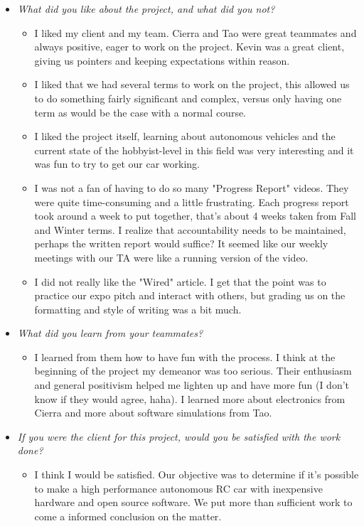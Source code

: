 \documentclass[compsoc,draftclsnofoot,onecolumn,10pt]{IEEEtran}
\begin{document}
\begin{itemize}
    \item \textit{What did you like about the project, and what did you not?}
    \begin{itemize}
        \item I liked my client and my team. Cierra and Tao were great teammates and always positive, eager to work on the project. Kevin was a great client, giving us pointers and keeping expectations within reason.
        \item I liked that we had several terms to work on the project, this allowed us to do something fairly significant and complex, versus only having one term as would be the case with a normal course.
        \item I liked the project itself, learning about autonomous vehicles and the current state of the hobbyist-level in this field was very interesting and it was fun to try to get our car working.
        \item I was not a fan of having to do so many "Progress Report" videos. They were quite time-consuming and a little frustrating. Each progress report took around a week to put together, that's about 4 weeks taken from Fall and Winter terms. I realize that accountability needs to be maintained, perhaps the written report would suffice? It seemed like our weekly meetings with our TA were like a running version of the video.
        \item I did not really like the "Wired" article. I get that the point was to practice our expo pitch and interact with others, but grading us on the formatting and style of writing was a bit much.
    \end{itemize}

    \item \textit{What did you learn from your teammates?}
    \begin{itemize}
        \item I learned from them how to have fun with the process. I think at the beginning of the project my demeanor was too serious. Their enthusiasm and general positivism helped me lighten up and have more fun (I don't know if they would agree, haha). I learned more about electronics from Cierra and more about software simulations from Tao.
    \end{itemize}

    \item \textit{If you were the client for this project, would you be satisfied with the work done?}
    \begin{itemize}
        \item I think I would be satisfied. Our objective was to determine if it's possible to make a high performance autonomous RC car with inexpensive hardware and open source software. We put more than sufficient work to come a informed conclusion on the matter.
    \end{itemize}


\end{itemize}
\end{document}
